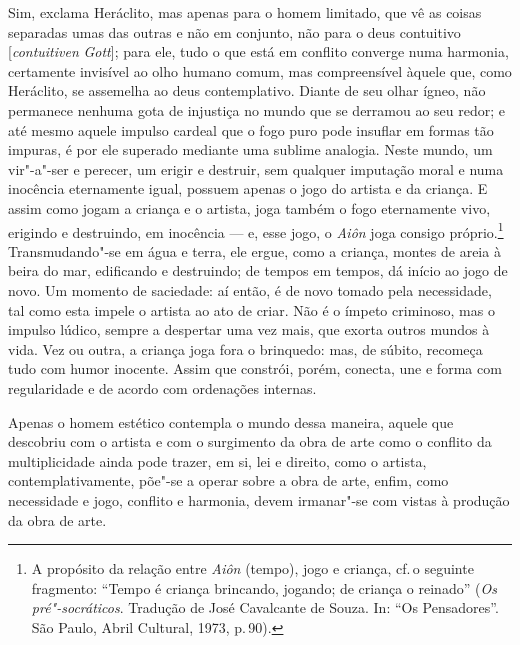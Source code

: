 Sim, exclama Heráclito, mas apenas para o homem limitado, que vê as coisas
separadas umas das outras e não em conjunto, não para o deus contuitivo
[\textit{contuitiven} \textit{Gott}]; para ele, tudo o que está em conflito
converge numa harmonia, certamente invisível ao olho humano comum, mas
compreensível àquele que, como Heráclito, se assemelha ao deus contemplativo.
Diante de seu olhar ígneo, não permanece nenhuma gota de injustiça no mundo
que se derramou ao seu redor; e até mesmo aquele impulso cardeal que o fogo
puro pode insuflar em formas tão impuras, é por ele superado mediante uma
sublime analogia. Neste mundo, um vir"-a"-ser e perecer, um erigir e
destruir, sem qualquer imputação moral e numa inocência eternamente igual,
possuem apenas o jogo do artista e da criança. E assim como jogam a criança e
o artista, joga também o fogo eternamente vivo, erigindo e destruindo, em
inocência --- e, esse jogo, o \textit{Aiôn} joga consigo próprio.\footnote{A propósito 
da relação entre \textit{Aiôn} (tempo), jogo e criança, cf.\,o seguinte fragmento:
 ``Tempo é criança brincando, jogando; de criança o reinado'' (\textit
 {Os pré"-socráticos}. Tradução de José Cavalcante de Souza. In: ``Os
 Pensadores''. São Paulo, Abril Cultural, 1973, p.\,90).} Transmudando"-se em
 água e terra, ele ergue, como a criança, montes de areia à beira do mar,
 edificando e destruindo; de tempos em tempos, dá início ao jogo de novo. Um
 momento de saciedade: aí então, é de novo tomado pela necessidade, tal como
 esta impele o artista ao ato de criar. Não é o ímpeto criminoso, mas o
 impulso lúdico, sempre a despertar uma vez mais, que exorta outros mundos à
 vida. Vez ou outra, a criança joga fora o brinquedo: mas, de súbito,
 recomeça tudo com humor inocente. Assim que constrói, porém, conecta, une e
 forma com regularidade e de acordo com ordenações internas.

Apenas o homem estético contempla o mundo dessa maneira, aquele que descobriu
com o artista e com o surgimento da obra de arte como o conflito da
multiplicidade ainda pode trazer, em si, lei e direito, como o artista,
contemplativamente, põe"-se a operar sobre a obra de arte, enfim, como
necessidade e jogo, conflito e harmonia, devem irmanar"-se com vistas à
produção da obra de arte.

